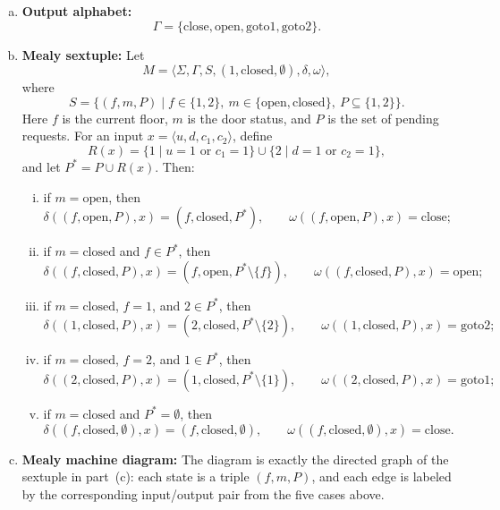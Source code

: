 \begin{enumerate}[{7.}1.]
\begin{enumerate}[(a)]
  \item \textbf{Output alphabet:}
  \[
    \Gamma=\{\text{close},\text{open},\text{goto1},\text{goto2}\}.
  \]

  \item \textbf{Mealy sextuple:}  Let
  \[
    M=\langle \Sigma,\Gamma,S,(1,\text{closed},\emptyset),\delta,\omega\rangle,
  \]
  where
  \[
    S=\{(f,m,P)\mid f\in\{1,2\},\ m\in\{\text{open},\text{closed}\},\
    P\subseteq\{1,2\}\}.
  \]
  Here $f$ is the current floor, $m$ is the door status, and $P$ is the set of
  pending requests.  For an input $x=\langle u,d,c_1,c_2\rangle$, define
  \[
    R(x)=\{ 1\mid u=1\text{ or }c_1=1 \}\cup
         \{ 2\mid d=1\text{ or }c_2=1 \},
  \]
  and let $P^*=P\cup R(x)$.  Then:
  \begin{enumerate}[(i)]
    \item if $m=\text{open}$, then
    \[
      \delta((f,\text{open},P),x)=(f,\text{closed},P^*),\qquad
      \omega((f,\text{open},P),x)=\text{close};
    \]
    \item if $m=\text{closed}$ and $f\in P^*$, then
    \[
      \delta((f,\text{closed},P),x)=(f,\text{open},P^*\setminus\{f\}),\qquad
      \omega((f,\text{closed},P),x)=\text{open};
    \]
    \item if $m=\text{closed}$, $f=1$, and $2\in P^*$, then
    \[
      \delta((1,\text{closed},P),x)=(2,\text{closed},P^*\setminus\{2\}),\qquad
      \omega((1,\text{closed},P),x)=\text{goto2};
    \]
    \item if $m=\text{closed}$, $f=2$, and $1\in P^*$, then
    \[
      \delta((2,\text{closed},P),x)=(1,\text{closed},P^*\setminus\{1\}),\qquad
      \omega((2,\text{closed},P),x)=\text{goto1};
    \]
    \item if $m=\text{closed}$ and $P^*=\emptyset$, then
    \[
      \delta((f,\text{closed},\emptyset),x)=(f,\text{closed},\emptyset),\qquad
      \omega((f,\text{closed},\emptyset),x)=\text{close}.
    \]
  \end{enumerate}

  \item \textbf{Mealy machine diagram:}  The diagram is exactly the directed graph
  of the sextuple in part~(c): each state is a triple $(f,m,P)$, and each edge
  is labeled by the corresponding input/output pair from the five cases above.


\end{enumerate}
\end{enumerate}
